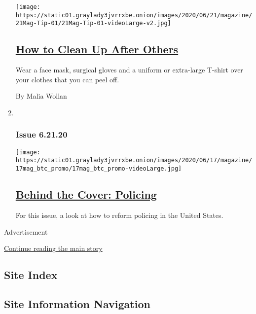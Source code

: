 \begin{enumerate}
  \texttt{[image: https://static01.graylady3jvrrxbe.onion/images/2020/06/21/magazine/21Mag-Tip-01/21Mag-Tip-01-videoLarge-v2.jpg]}

  \hypertarget{how-to-clean-up-after-others}{%
  \subsection{\texorpdfstring{\href{/2020/06/16/magazine/how-to-clean-up-after-others.html}{How
  to Clean Up After
  Others}}{How to Clean Up After Others}}\label{how-to-clean-up-after-others}}

  Wear a face mask, surgical gloves and a uniform or extra-large T-shirt
  over your clothes that you can peel off.

  By Malia Wollan
\item ~
  \hypertarget{issue-62120}{%
  \subsubsection{Issue 6.21.20}\label{issue-62120}}

  \texttt{[image: https://static01.graylady3jvrrxbe.onion/images/2020/06/17/magazine/17mag\_btc\_promo/17mag\_btc\_promo-videoLarge.jpg]}

  \hypertarget{behind-the-cover-policing}{%
  \subsection{\texorpdfstring{\href{/2020/06/18/magazine/behind-the-cover-policing.html}{Behind
  the Cover:
  Policing}}{Behind the Cover: Policing}}\label{behind-the-cover-policing}}

  For this issue, a look at how to reform policing in the United States.
\end{enumerate}

Advertisement

\protect\hyperlink{after-mid1}{Continue reading the main story}

\hypertarget{site-index}{%
\subsection{Site Index}\label{site-index}}

\hypertarget{site-information-navigation}{%
\subsection{Site Information
Navigation}\label{site-information-navigation}}

